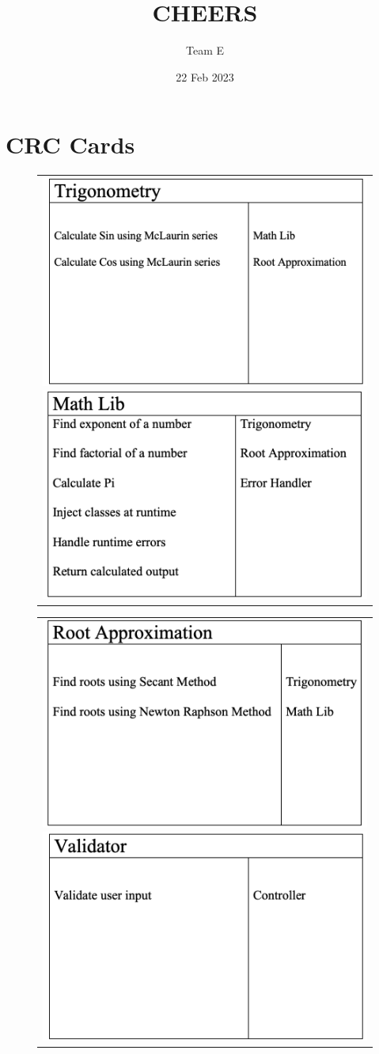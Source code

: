 \documentclass{report}
\begin{document}
\title{CHEERS}
\author{Team E}
\date{22 Feb 2023}
\maketitle

\chapter*{CRC Cards}
\begin{figure}[h!]
    \centering
    \begin{tabular}{@{}c@{}}
      \includegraphics[width=.4\linewidth]{resources/Trigonometry.png} 
        \hspace*{30pt}
      \includegraphics[width=.4\linewidth]{resources/MathLib.png}
    \end{tabular}
  
    \begin{tabular}{@{}c@{}}
        \includegraphics[width=.4\linewidth]{resources/RootApproximation.png} 
          \hspace*{30pt}
        \includegraphics[width=.4\linewidth]{resources/Validator.png}
      \end{tabular}


\end{figure}
\end{document}
